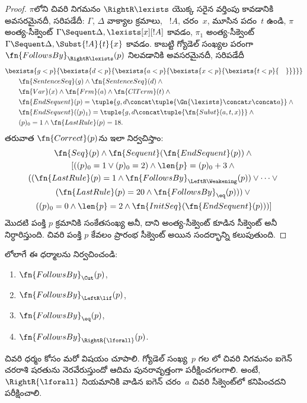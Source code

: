\documentclass[../../../include/open-logic-section]{subfiles}
\begin{document}
\begin{proof}
$\pi$లోని చివరి నిగమనం $\RightR\lexists$ యొక్క సరైన వర్తింపు కావడానికి
అవసరమైనదీ, సరిపడేదీ: $\Gamma$, $\Delta$ వాక్యాల క్రమాలు,
~$!A$, చరం~$x$, మూసిన పదం~$t$ ఉండి,
$\pi$ అంత్య-సీక్వెంట్ $\Gamma\Sequent\Delta,\lexists[x][!A]$ కావడం,
$\pi_1$ అంత్య-సీక్వెంట్ $\Gamma\Sequent\Delta,\Subst{!A}{t}{x}$ కావడం.
కాబట్టి గ్యోడెల్ సంఖ్యల పరంగా $\fn{FollowsBy}_{\RightR\lexists}(p)$
నిలవడానికి అవసరమైనదీ, సరిపడేదీ
\begin{align*}
  & \bexists{g<p}{\bexists{d<p}{\bexists{a<p}{\bexists{x<p}{\bexists{t<p}{\quad}}}}}\\
  & \qquad \fn{SentenceSeq}(g)\land\fn{SentenceSeq}(d)\land{}\\
  & \qquad \fn{Var}(x)\land\fn{Frm}(a)\land\fn{ClTerm}(t)\land{}\\
  & \qquad \fn{EndSequent}(p)=
  \tuple{
    g,
    d\concat\tuple{\Gn{\lexists}\concat x\concat a}
  }\land{}\\
  & \qquad \fn{EndSequent}((p)_1)=
  \tuple{
    g,
    d\concat\tuple{\fn{Subst}(a,t,x)}
  }\land{}\\
  & \qquad (p)_0=1\land\fn{LastRule}(p)=18.
\end{align*}
తరువాత $\fn{Correct}(p)$ను ఇలా నిర్వచిస్తాం:
\begin{multline*}
  \fn{Seq}(p)\land\fn{Sequent}(\fn{EndSequent}(p))\land{}\\
  [((p)_0=1\lor(p)_0=2)\land\len{p}=(p)_0+3\land{}\\
  ((\fn{LastRule}(p)=1\land\fn{FollowsBy}_{\LeftR\Weakening}(p))
  \lor\dots\lor{}\\
  (\fn{LastRule}(p)=20\land\fn{FollowsBy}_{\eq}(p)))\lor{}\\
  ((p)_0=0\land\len{p}=2\land\fn{InitSeq}(\fn{EndSequent}(p)))]
\end{multline*}
మొదటి పంక్తి $p$ క్రమానికి సంకేతసంఖ్య అనీ, దాని అంత్య-సీక్వెంట్
 కూడిన సీక్వెంట్ అనీ నిర్ధారిస్తుంది.
చివరి పంక్తి $p$ కేవలం ప్రారంభ సీక్వెంట్ అయిన సందర్భాన్ని కలుపుతుంది.
\end{proof}

\begin{prob}
  లోలాగే ఈ ధర్మాలను నిర్వచించండి:
  \begin{enumerate}
  \item $\fn{FollowsBy}_{\Cut}(p)$,
  \item $\fn{FollowsBy}_{\LeftR\lif}(p)$,
  \item $\fn{FollowsBy}_{\eq}(p)$,
  \item $\fn{FollowsBy}_{\RightR{\lforall}}(p)$.
  \end{enumerate}
  చివరి ధర్మం కోసం మరో విషయం చూపాలి. గ్యోడెల్ సంఖ్య~$p$ గల
  లో చివరి నిగమనం ఐగెన్ చరరాశి షరతును
  నెరవేరుస్తుందో ఆదిమ పునరావృత్తంగా పరీక్షించగలగాలి. అంటే,
$\RightR{\lforall}$ నియమానికి వాడిన ఐగెన్ చరం~$a$ చివరి సీక్వెంట్‌లో
  కనిపించదని పరీక్షించాలి.
\end{prob}
\end{document}
